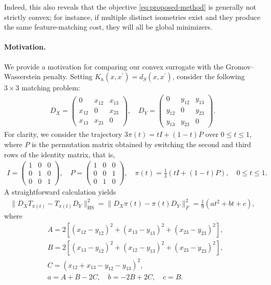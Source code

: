 \documentclass{article}
\begin{document}
Indeed, this also reveals that the objective \eqref{eq:proposed-method} is generally not strictly convex; for instance, if multiple distinct isometries exist and they produce the same feature-matching cost, they will all be global minimizers.

\paragraph{Motivation.}  
We provide a motivation for comparing our convex surrogate with the Gromov--Wasserstein penalty.  
Setting $K_h(x,x^\prime)=d_S(x,x^\prime)$, consider the following $3 \times 3$ matching problem:
\begin{align*}
	D_X = \begin{pmatrix}
		0 & x_{12} & x_{13} \\
		x_{12} & 0 & x_{23} \\
		x_{13} & x_{23} & 0
	\end{pmatrix} , 
	\quad
	D_Y = \begin{pmatrix}
		0 & y_{12} & y_{13} \\
		y_{12} & 0 & y_{23} \\
		y_{13} & y_{23} & 0
	\end{pmatrix} .
\end{align*}
For clarity, we consider the trajectory $3\pi(t) = tI + (1-t)P$ over $0 \leq t \leq 1$,  
where $P$ is the permutation matrix obtained by switching the second and third rows of the identity matrix, that is,
\begin{align*}
	I = \begin{pmatrix}
		1 & 0 & 0 \\
		0 & 1 & 0 \\
		0 & 0 & 1
	\end{pmatrix} , \quad
	P = \begin{pmatrix}
		1 & 0 & 0 \\
		0 & 0 & 1 \\
		0 & 1 & 0
	\end{pmatrix} , \quad
	\pi(t) = \frac{1}{3} \left(tI + (1-t)P\right) , \quad 0 \leq t \leq 1 . 
\end{align*} 
A straightforward calculation yields
\begin{align*}
	\|D_XT_{\pi(t)} - T_{\pi(t)}D_Y \|_{\mathrm{HS}}^2 = \| D_X\pi(t) - \pi(t)D_Y \|_F^2 = \frac{1}{9}(at^2 + bt + c) ,
\end{align*}
where
\begin{align*}
	&A = 2\left[(x_{12} - y_{12})^2 + (x_{13} - y_{13})^2 + (x_{23} - y_{23})^2\right] , \\
	&B = 2\left[(x_{13} - y_{12})^2 + (x_{12} - y_{13})^2 + (x_{23} - y_{23})^2\right] , \\
	&C = (x_{12} + x_{13} - y_{12} - y_{13})^2 , \\[5pt]
	&a = A + B - 2C , \quad b = -2B + 2C , \quad c = B .
\end{align*}
\end{document}
